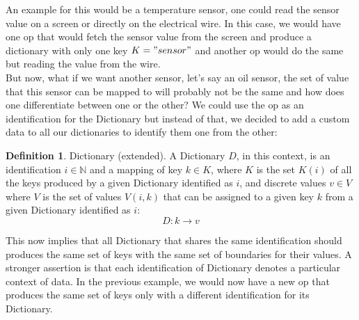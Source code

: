 \documentclass[12pt]{article}
\theoremstyle{definition}
\newtheorem{definition}{Definition}[section]
\theoremstyle{definition}
\theoremstyle{remark}
\begin{document}
An example for this would be a temperature sensor, one could read the sensor value on a screen or directly on the electrical wire. In this case, we would have one \gls{op} that would fetch the sensor value from the screen and produce a dictionary with only one key $K = { "sensor" }$ and another \gls{op} would do the same but reading the value from the wire.\\

But now, what if we want another sensor, let's say an oil sensor, the set of value that this sensor can be mapped to will probably not be the same and how does one differentiate between one or the other? We could use the \gls{op} as an identification for the Dictionary but instead of that, we decided to add a custom data to all our dictionaries to identify them one from the other:

\theoremstyle{definition}
\begin{definition}{Dictionary (extended).} A Dictionary $D$, in this context, is an identification $i \in \mathbb{N}$ and a mapping of key $k \in K$, where $K$ is the set $K(i)$ of all the keys produced by a given Dictionary identified as $i$, and discrete values $v \in V$ where $V$ is the set of values $V(i, k)$ that can be assigned to a given key $k$ from a given Dictionary identified as $i$:
$$D: k \to v$$
\end{definition}

This now implies that all Dictionary that shares the same identification should produces the same set of keys with the same set of boundaries for their values. A stronger assertion is that each identification of Dictionary denotes a particular context of data. In the previous example, we would now have a new \gls{op} that produces the same set of keys only with a different identification for its Dictionary.





\end{document}
